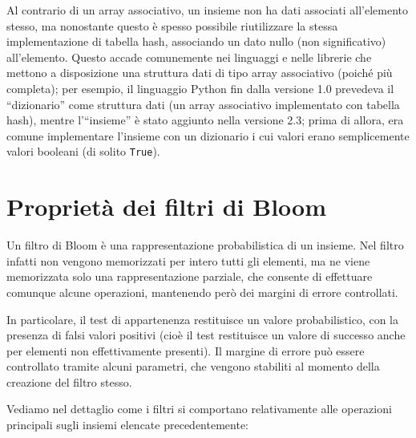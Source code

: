 Al contrario di un array associativo, un insieme non ha dati associati all'elemento stesso, ma
nonostante questo è spesso possibile riutilizzare la stessa implementazione di tabella hash,
associando un dato nullo (non significativo) all'elemento. Questo accade comunemente nei linguaggi e
nelle librerie che mettono a disposizione una struttura dati di tipo array associativo (poiché più
completa); per esempio, il linguaggio Python fin dalla versione 1.0 prevedeva il ``dizionario'' come
struttura dati (un array associativo implementato con tabella hash), mentre l'``insieme'' è stato
aggiunto nella versione 2.3; prima di allora, era comune implementare l'insieme con un dizionario i
cui valori erano semplicemente valori booleani (di solito \verb|True|).

\section{Proprietà dei filtri di Bloom}

Un filtro di Bloom \cite{bloomfilters} è una rappresentazione probabilistica di un insieme. Nel
filtro infatti non vengono memorizzati per intero tutti gli elementi, ma ne viene memorizzata solo
una rappresentazione parziale, che consente di effettuare comunque alcune operazioni, mantenendo
però dei margini di errore controllati.

In particolare, il test di appartenenza restituisce un valore probabilistico, con la presenza di
falsi valori positivi (cioè il test restituisce un valore di successo anche per elementi non
effettivamente presenti). Il margine di errore può essere controllato tramite alcuni parametri, che
vengono stabiliti al momento della creazione del filtro stesso.

Vediamo nel dettaglio come i filtri si comportano relativamente alle operazioni principali sugli
insiemi elencate precedentemente:

